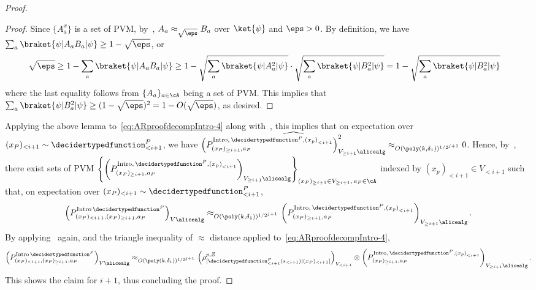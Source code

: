 \begin{proof}
	\begin{proof}
		Since $\{A_a^x\}$ is a set of PVM, by~, $A_{a} \approx_{\sqrt{\eps}}  B_{a}$ over $\ket{\psi}$ and $\eps > 0$. By definition, we have $\sum_{a} \braket{\psi| A_a B_a|\psi} \geq 1 - \sqrt{\eps}$, or
		\begin{align*}
			\sqrt{\eps} &\geq 1 -  \sum_{a} \braket{\psi| A_a B_a|\psi} \geq 1 - \sqrt{\sum_a \braket{\psi| A_a^2|\psi}} \cdot  \sqrt{\sum_a \braket{\psi| B_a^2|\psi}} = 1 - \sqrt{\sum_a \braket{\psi| B_a^2|\psi}} 
		\end{align*}
		where the last equality follows from $\{A_a\}_{a \in\cA}$ being a set of PVM. This implies that $ \sum_a \braket{\psi| B_a^2|\psi}  \geq (1 - \sqrt{\eps})^2 = 1 - O(\sqrt{\eps})$, as desired. 
	\end{proof}
	Applying the above lemma to~\eqref{eq:ARproofdecompIntro-4} along with~, this implies that on expectation over $(x_P)_{<i+1} \sim \decidertypedfunction^P_{<i+1}$, we have $\widehat{\left(P^{\text{Intro}, \, \decidertypedfunction^P, \left(x_p\right)_{< i+1}}_{(x_P)_{\geq i+1}, a_P} \right)_{V_{\geq i+1} \alicealg}^2 } \approx_{O(\poly(k, \delta_1))^{1/2^{j+1}}} 0$. Hence, by~, there exist sets of PVM $\left\{\left(P^{\text{Intro}, \, \decidertypedfunction^P, \left(x_p\right)_{< i+1}}_{(x_P)_{\geq i+1}, a_P} \right)_{V_{\geq i+1} \alicealg} \right\}_{{(x_P)_{\geq i+1}} \in V_{\geq i+1}, \, a_P \in  \cA}$ indexed by $ \left(x_p\right)_{< i+1} \in V_{< i+1}$ such that, on expectation over $(x_P)_{<i+1} \sim \decidertypedfunction^P_{<i+1}$, 
	\begin{equation*}
		\left(P^{\text{Intro} \, \decidertypedfunction^P}_{(x_P)_{< i+1}, (x_P)_{\geq i+1}, a_P} \right)_{V \alicealg}  \approx_{O(\poly(k, \delta_1))^{1/2^{j+1}}} \left(P^{\text{Intro}, \, \decidertypedfunction^P, \left(x_p\right)_{< i+1}}_{(x_P)_{\geq i+1}, a_P} \right)_{V_{\geq i+1} \alicealg}.
	\end{equation*}
	By applying~ again, and the triangle inequality of $\approx$ distance applied to~\eqref{eq:ARproofdecompIntro-4},
	\begin{equation*}
		\left(P^{\text{Intro} \, \decidertypedfunction^P}_{(x_P)_{< i+1}, (x_P)_{\geq i+1}, a_P} \right)_{V \alicealg}  \approx_{O(\poly(k, \delta_1))^{1/2^{j+1}}} \left(\rho^{p,Z}_{[\decidertypedfunction^P_{< i+1}(s_{< i+1})|(x_P)_{< i+1} ]}\right)_{V_{< i+1}} \otimes \left(P^{\text{Intro}, \, \decidertypedfunction^P, \left(x_p\right)_{< i+1}}_{(x_P)_{\geq i+1}, a_P} \right)_{V_{\geq i+1} \alicealg}.
	\end{equation*}
	This shows the claim for $i+1$, thus concluding the proof.
	

\end{proof}

